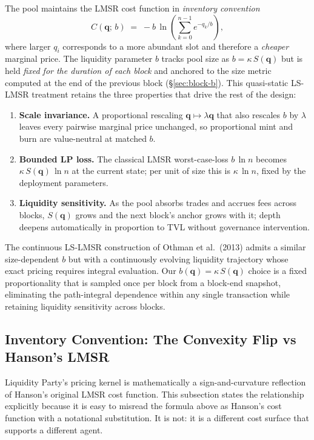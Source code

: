 \documentclass[11pt]{article}
\newcommand{\Sm}{S(\mathbf{q})}
\newcommand{\bofq}{b(\mathbf{q})}
\begin{document}
The pool maintains the LMSR cost function in \emph{inventory convention}
\begin{equation}
  C(\mathbf{q};\,b) \;=\; -b\,\ln\!\left(\sum_{k=0}^{n-1} e^{-q_k/b}\right),
\end{equation}
where larger $q_i$ corresponds to a more abundant slot and therefore a
\emph{cheaper} marginal price. The liquidity parameter $b$ tracks pool
size as $b = \kappa\,\Sm$ but is held \emph{fixed for the duration of
each block} and anchored to the size metric computed at the end of the
previous block (\S\ref{sec:block-b}). This quasi-static LS-LMSR
treatment retains the three properties that drive the rest of the
design:

\begin{enumerate}
  \item \textbf{Scale invariance.} A proportional rescaling
        $\mathbf{q} \mapsto \lambda\mathbf{q}$ that also rescales $b$ by
        $\lambda$ leaves every pairwise marginal price unchanged, so
        proportional mint and burn are value-neutral at matched $b$.
  \item \textbf{Bounded LP loss.} The classical LMSR worst-case-loss
        $b\,\ln n$ becomes $\kappa\,\Sm\,\ln n$ at the current state; per
        unit of size this is $\kappa\,\ln n$, fixed by the deployment
        parameters.
  \item \textbf{Liquidity sensitivity.} As the pool absorbs trades and
        accrues fees across blocks, $\Sm$ grows and the next block's
        anchor grows with it; depth deepens automatically in proportion
        to TVL without governance intervention.
\end{enumerate}

The continuous LS-LMSR construction of Othman et al.\ (2013) admits a
similar size-dependent $b$ but with a continuously evolving liquidity
trajectory whose exact pricing requires integral evaluation. Our
$\bofq = \kappa\,\Sm$ choice is a fixed proportionality that is sampled
once per block from a block-end snapshot, eliminating the path-integral
dependence within any single transaction while retaining liquidity
sensitivity across blocks.

\subsection{Inventory Convention: The Convexity Flip vs Hanson's LMSR}
\label{sec:convention-flip}

Liquidity Party's pricing kernel is mathematically a sign-and-curvature
reflection of Hanson's original LMSR cost function. This subsection
states the relationship explicitly because it is easy to misread the
formula above as Hanson's cost function with a notational
substitution. It is not: it is a different cost surface that supports
a different agent.
\end{document}
